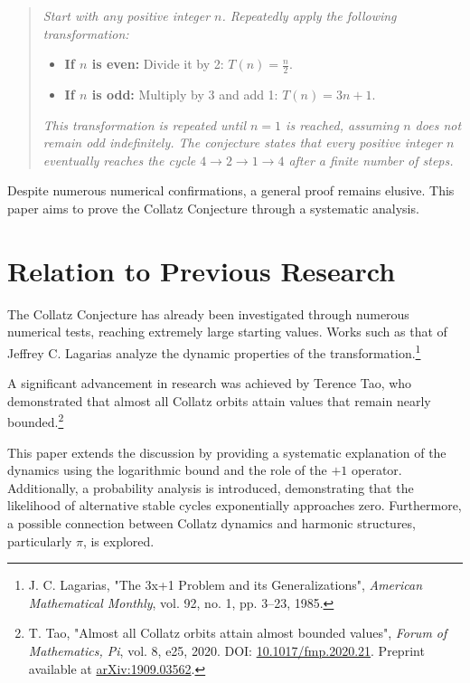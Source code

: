 \documentclass[a4paper,12pt]{article}
\begin{document}
\begin{quote}
\textit{Start with any positive integer \( n \). Repeatedly apply the following transformation:}
\begin{itemize}
    \item \textbf{If \( n \) is even:} Divide it by 2: \( T(n) = \frac{n}{2} \).
    \item \textbf{If \( n \) is odd:} Multiply by 3 and add 1: \( T(n) = 3n + 1 \).
\end{itemize}
\textit{This transformation is repeated until \( n = 1 \) is reached, assuming \( n \) does not remain odd indefinitely. The conjecture states that every positive integer \( n \) eventually reaches the cycle \( 4 \to 2 \to 1 \to 4 \) after a finite number of steps.}
\end{quote}

Despite numerous numerical confirmations, a general proof remains elusive. This paper aims to prove the Collatz Conjecture through a systematic analysis.

\section{Relation to Previous Research}
The Collatz Conjecture has already been investigated through numerous numerical tests, reaching extremely large starting values. Works such as that of Jeffrey C. Lagarias analyze the dynamic properties of the transformation.\footnote{J. C. Lagarias, "The 3x+1 Problem and its Generalizations", \textit{American Mathematical Monthly}, vol. 92, no. 1, pp. 3–23, 1985.} 

A significant advancement in research was achieved by Terence Tao, who demonstrated that almost all Collatz orbits attain values that remain nearly bounded.\footnote{T. Tao, "Almost all Collatz orbits attain almost bounded values", \textit{Forum of Mathematics, Pi}, vol. 8, e25, 2020. DOI: \href{https://doi.org/10.1017/fmp.2020.21}{10.1017/fmp.2020.21}. Preprint available at \href{https://arxiv.org/abs/1909.03562}{arXiv:1909.03562}.} 

This paper extends the discussion by providing a systematic explanation of the dynamics using the logarithmic bound and the role of the \(+1\) operator. Additionally, a probability analysis is introduced, demonstrating that the likelihood of alternative stable cycles exponentially approaches zero. Furthermore, a possible connection between Collatz dynamics and harmonic structures, particularly \(\pi\), is explored.
\end{document}
